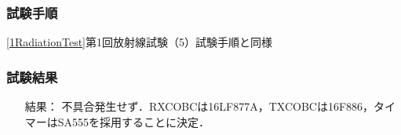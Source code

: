 \subsubsection{試験手順}
\ref{1RadiationTest}第1回放射線試験（5）試験手順と同様

\subsubsection{試験結果}
\begin{itemize}
	\item[　結果：]不具合発生せず．RXCOBCは16LF877A，TXCOBCは16F886，タイマーはSA555を採用することに決定．
\end{itemize}
